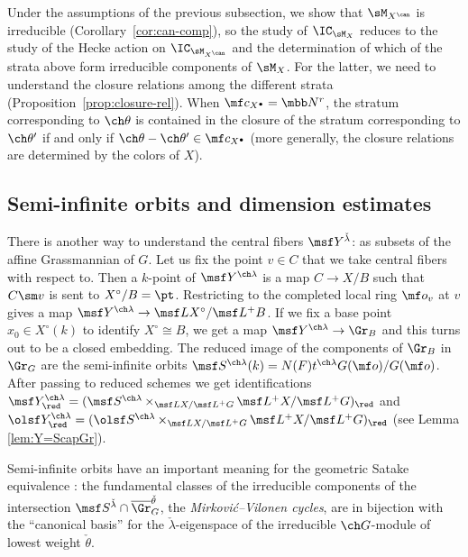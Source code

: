 \documentclass[final]{amsart}
\theoremstyle{remark}
\theoremstyle{definition}
\DeclareMathOperator*{\xt}{\times}
\numberwithin{equation}{section}
\begin{document}
Under the assumptions of the previous subsection, we show that 
$\sM_{X^\can}$ is irreducible (Corollary~\ref{cor:can-comp}), so the study 
of $\IC_{\sM_X}$ reduces to the study of the Hecke action on $\IC_{\sM_{X^\can}}$ and 
the determination of which of the strata above form irreducible components of $\sM_X$. 
For the latter, we need to understand the closure relations among the different strata (Proposition~\ref{prop:closure-rel}). When $\mf c_{X^\bullet}=\mbb N^r$, the stratum corresponding to $\ch\theta$ 
is contained in the closure of the stratum corresponding to $\ch\theta'$ if and only if $\ch\theta-\ch\theta' \in \mf c_{X^\bullet}$ (more generally, the closure relations are determined by the colors of $X$).  



\subsection{Semi-infinite orbits and dimension estimates}
\label{subsection-dimensions}

There is another way to understand the central fibers $\msf Y^{\check\lambda}$: as subsets of the affine Grassmannian of $G$. 
Let us fix the point $v \in C$ that we take central fibers with respect to. 
Then a $k$-point of $\msf Y^{\ch\lambda}$ is a map $C \to X/B$ such that $C\sm v$ is sent to $X^\circ/B=\pt$. 
Restricting to the completed local ring $\mf o_v$ at $v$ gives a map 
$\msf Y^{\ch\lambda} \to \msf L X^\circ / \msf L^+B$. 
If we fix a base point $x_0\in X^\circ(k)$ to identify $X^\circ \cong B$, we get a map 
$\msf Y^{\ch\lambda} \to \Gr_B$ and this turns out to be a closed embedding. 
The reduced image of the components of $\Gr_B$ in $\Gr_G$ are the
semi-infinite orbits $\msf S^{\ch\lambda}(k) = N(F) t^{\ch\lambda} G(\mf o)/G(\mf o)$. 
After passing to reduced schemes we get identifications 
$\msf Y^{\ch\lambda}_\red = (\msf S^{\ch\lambda} \xt_{\msf L X/ \msf L^+G} \msf L^+ X / \msf L^+G)_\red$ 
and $\olsf Y^{\ch\lambda}_\red = (\olsf S^{\ch\lambda} \xt_{\msf L X /\msf L^+G} \msf L^+ X / \msf L^+ G)_\red$ (see Lemma \ref{lem:Y=ScapGr}). 

\smallskip

Semi-infinite orbits have an important meaning for the geometric Satake equivalence \cite{MV}: the fundamental classes of the irreducible components of the intersection $\msf S^{\check\lambda} \cap \overline\Gr_G^{\check\theta}$, the \emph{Mirkovi\'c--Vilonen cycles}, are in bijection with the ``canonical basis'' for the $\check\lambda$-eigenspace of the irreducible $\ch G$-module of lowest weight $\check\theta$. 
\end{document}
